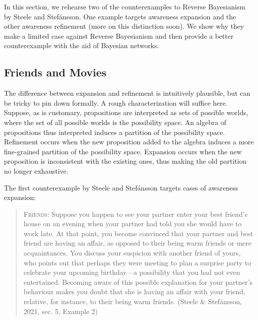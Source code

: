 \documentclass[
  11pt,
  dvipsnames,enabledeprecatedfontcommands]{scrartcl}
\begin{document}
In this section, we rehearse two of the counterexamples to Reverse
Bayesianism by Steele and Stefánsson. One example targets awareness
expansion and the other awareness refinement (more on this distinction
soon). We show why they make a limited case against Reverse Bayesianism
and then provide a better counterexample with the aid of Bayesian
networks.

\hypertarget{friends-and-movies}{%
\subsection{Friends and Movies}\label{friends-and-movies}}

\label{sec:counterexamples}

The difference between expansion and refinement is intuitively
plausible, but can be tricky to pin down formally. A rough
characterization will suffice here. Suppose, as is customary,
propositions are interpreted as sets of possible worlds, where the set
of all possible worlds is the possibility space. An algebra of
propositions thus interpreted induces a partition of the possibility
space. Refinement occurs when the new proposition added to the algebra
induces a more fine-grained partition of the possibility space.
Expansion occurs when the new proposition is inconsistent with the
existing ones, thus making the old partition no longer exhaustive.

The first counterexample by Steele and Stefánsson targets cases of
awareness expansion:

\begin{quote}
\textsc{Friends}: Suppose you happen to see your partner enter your best
friend's house on an evening when your partner had told you she would
have to work late. At that point, you become convinced that your partner
and best friend are having an affair, as opposed to their being warm
friends or mere acquaintances. You discuss your suspicion with another
friend of yours, who points out that perhaps they were meeting to plan a
surprise party to celebrate your upcoming birthday---a possibility that
you had not even entertained. Becoming aware of this possible
explanation for your partner's behaviour makes you doubt that she is
having an affair with your friend, relative, for instance, to their
being warm friends. (Steele \& Stefánsson, 2021, sec. 5, Example 2)
\end{quote}

\doublespace
\end{document}
